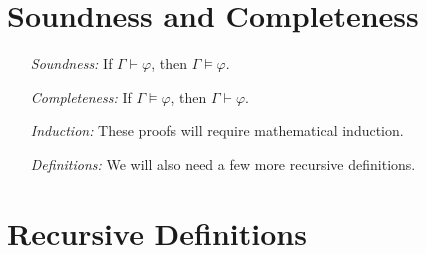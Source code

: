 \documentclass[a4paper, 11pt]{article} %
\begin{document}
\section*{Soundness and Completeness}

\begin{enumerate}
  \item[\it Soundness:] If $\Gamma \vdash \varphi$, then $\Gamma \vDash \varphi$.
  \item[\it Completeness:] If $\Gamma \vDash \varphi$, then $\Gamma \vdash \varphi$.
  \item[\it Induction:] These proofs will require mathematical induction. 
  \item[\it Definitions:] We will also need a few more recursive definitions.
\end{enumerate}



\section*{Recursive Definitions}
\end{document}
